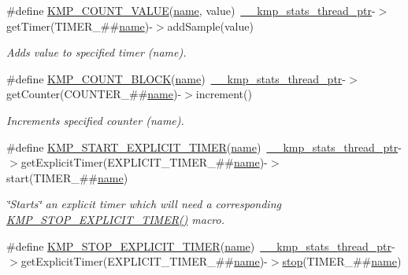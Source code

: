 \begin{DoxyCompactItemize}
\#define \hyperlink{group__STATS__GATHERING_ga7691000a7864b475046ae62fcf0536ac}{K\-M\-P\-\_\-\-C\-O\-U\-N\-T\-\_\-\-V\-A\-L\-U\-E}(\hyperlink{ittnotify__static_8h_a1c34b35a4952969fef60192313bba34a}{name}, value)~\hyperlink{kmp__stats_8h_ae8b6bdb1368ab875fdb8322ba2de5803}{\-\_\-\-\_\-kmp\-\_\-stats\-\_\-thread\-\_\-ptr}-\/$>$get\-Timer(T\-I\-M\-E\-R\-\_\-\#\#\hyperlink{ittnotify__static_8h_a1c34b35a4952969fef60192313bba34a}{name})-\/$>$add\-Sample(value)
\begin{DoxyCompactList}\small\item\em Adds value to specified timer (name). \end{DoxyCompactList}\item 
\#define \hyperlink{group__STATS__GATHERING_ga7fa64ec62947bf0b97f3f4778dd22196}{K\-M\-P\-\_\-\-C\-O\-U\-N\-T\-\_\-\-B\-L\-O\-C\-K}(\hyperlink{ittnotify__static_8h_a1c34b35a4952969fef60192313bba34a}{name})~\hyperlink{kmp__stats_8h_ae8b6bdb1368ab875fdb8322ba2de5803}{\-\_\-\-\_\-kmp\-\_\-stats\-\_\-thread\-\_\-ptr}-\/$>$get\-Counter(C\-O\-U\-N\-T\-E\-R\-\_\-\#\#\hyperlink{ittnotify__static_8h_a1c34b35a4952969fef60192313bba34a}{name})-\/$>$increment()
\begin{DoxyCompactList}\small\item\em Increments specified counter (name). \end{DoxyCompactList}\item 
\#define \hyperlink{group__STATS__GATHERING_ga8b26485fe6ad4f74b63e54c42fcfd875}{K\-M\-P\-\_\-\-S\-T\-A\-R\-T\-\_\-\-E\-X\-P\-L\-I\-C\-I\-T\-\_\-\-T\-I\-M\-E\-R}(\hyperlink{ittnotify__static_8h_a1c34b35a4952969fef60192313bba34a}{name})~\hyperlink{kmp__stats_8h_ae8b6bdb1368ab875fdb8322ba2de5803}{\-\_\-\-\_\-kmp\-\_\-stats\-\_\-thread\-\_\-ptr}-\/$>$get\-Explicit\-Timer(E\-X\-P\-L\-I\-C\-I\-T\-\_\-\-T\-I\-M\-E\-R\-\_\-\#\#\hyperlink{ittnotify__static_8h_a1c34b35a4952969fef60192313bba34a}{name})-\/$>$start(T\-I\-M\-E\-R\-\_\-\#\#\hyperlink{ittnotify__static_8h_a1c34b35a4952969fef60192313bba34a}{name})
\begin{DoxyCompactList}\small\item\em \char`\"{}\-Starts\char`\"{} an explicit timer which will need a corresponding \hyperlink{group__STATS__GATHERING_ga6e4f12c6bec4068d72ef9e84516ad01d}{K\-M\-P\-\_\-\-S\-T\-O\-P\-\_\-\-E\-X\-P\-L\-I\-C\-I\-T\-\_\-\-T\-I\-M\-E\-R()} macro. \end{DoxyCompactList}\item 
\#define \hyperlink{group__STATS__GATHERING_ga6e4f12c6bec4068d72ef9e84516ad01d}{K\-M\-P\-\_\-\-S\-T\-O\-P\-\_\-\-E\-X\-P\-L\-I\-C\-I\-T\-\_\-\-T\-I\-M\-E\-R}(\hyperlink{ittnotify__static_8h_a1c34b35a4952969fef60192313bba34a}{name})~\hyperlink{kmp__stats_8h_ae8b6bdb1368ab875fdb8322ba2de5803}{\-\_\-\-\_\-kmp\-\_\-stats\-\_\-thread\-\_\-ptr}-\/$>$get\-Explicit\-Timer(E\-X\-P\-L\-I\-C\-I\-T\-\_\-\-T\-I\-M\-E\-R\-\_\-\#\#\hyperlink{ittnotify__static_8h_a1c34b35a4952969fef60192313bba34a}{name})-\/$>$\hyperlink{extractExternal_8cpp_aaabd632593ae454ee6ac33cc02d1d215}{stop}(T\-I\-M\-E\-R\-\_\-\#\#\hyperlink{ittnotify__static_8h_a1c34b35a4952969fef60192313bba34a}{name})

\end{DoxyCompactItemize}
